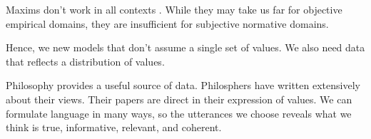 \documentclass{article}
\newcommand{\pcite}[1]{\parencite{#1}}
\begin{document}
Maxims don't work in all contexts \pcite{kasirzadeh2023conversation}.
While they may take us far for objective empirical domains, they are insufficient for subjective normative domains.

Hence, we new models that don't assume a single set of values.
We also need data that reflects a distribution of values.

Philosophy provides a useful source of data.
Philosphers have written extensively about their views.
Their papers are direct in their expression of values.
We can formulate language in many ways, so the utterances we choose reveals what we think is true, informative, relevant, and coherent. \pcite{grice1975logic}









\end{document}
